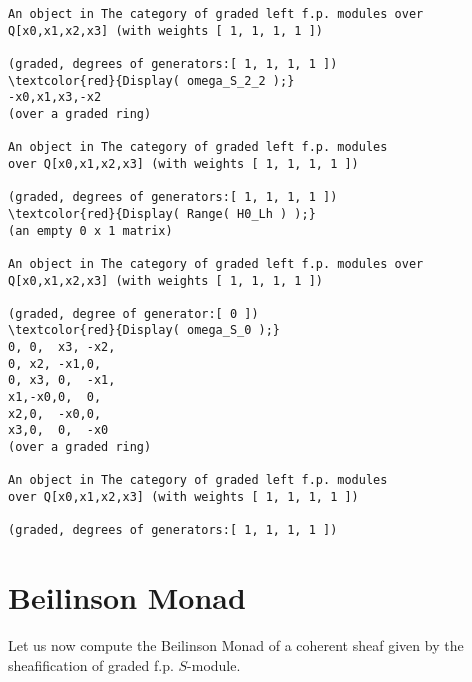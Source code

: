 \documentclass[16pt,a4paper]{extarticle}
\theoremstyle{definition}
\begin{document}
\begin{Verbatim}[commandchars=\\\{\}]
An object in The category of graded left f.p. modules over Q[x0,x1,x2,x3] (with weights [ 1, 1, 1, 1 ])
	
(graded, degrees of generators:[ 1, 1, 1, 1 ])
\textcolor{red}{Display( omega_S_2_2 );}
-x0,x1,x3,-x2
(over a graded ring)
	
An object in The category of graded left f.p. modules
over Q[x0,x1,x2,x3] (with weights [ 1, 1, 1, 1 ])
	
(graded, degrees of generators:[ 1, 1, 1, 1 ])
\textcolor{red}{Display( Range( H0_Lh ) );}
(an empty 0 x 1 matrix)
	
An object in The category of graded left f.p. modules over Q[x0,x1,x2,x3] (with weights [ 1, 1, 1, 1 ])
	
(graded, degree of generator:[ 0 ])
\textcolor{red}{Display( omega_S_0 );}
0, 0,  x3, -x2,
0, x2, -x1,0,  
0, x3, 0,  -x1,
x1,-x0,0,  0,  
x2,0,  -x0,0,  
x3,0,  0,  -x0 
(over a graded ring)

An object in The category of graded left f.p. modules
over Q[x0,x1,x2,x3] (with weights [ 1, 1, 1, 1 ])

(graded, degrees of generators:[ 1, 1, 1, 1 ])
\end{Verbatim}

\section{Beilinson Monad}
Let us now compute the Beilinson Monad of a coherent sheaf given by the sheafification of graded f.p. $S$-module.
\end{document}
